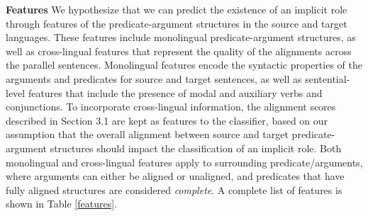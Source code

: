 \documentclass[11pt]{article}
\begin{document}
{\bf  \flushleft Features}
We hypothesize that we can predict the existence of an implicit role through features of the predicate-argument structures in the source and target languages. These features include monolingual predicate-argument structures, as well as cross-lingual features that represent the quality of the alignments across the parallel sentences. Monolingual features encode the syntactic properties of the arguments and predicates for source and target sentences, as well as sentential-level features that include the presence of modal and auxiliary verbs and conjunctions. To incorporate cross-lingual information, the alignment scores described in Section 3.1 are kept as features to the classifier, based on our assumption that the overall alignment between source and target predicate-argument structures should impact the classification of an implicit role. Both monolingual and cross-lingual features apply to surrounding predicate/arguments, where arguments can either be aligned or unaligned, and predicates that have fully aligned structures are considered \textit{complete}. A complete list of features is shown in Table \ref{features}.
\end{document}

